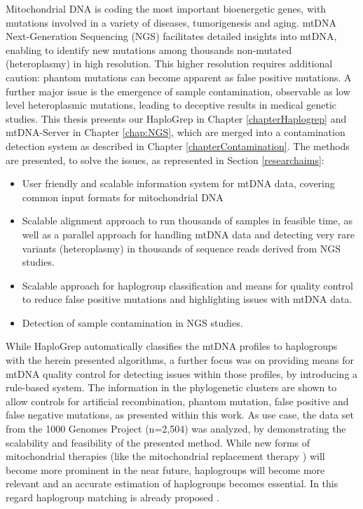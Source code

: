 Mitochondrial DNA is coding the most important bioenergetic genes, with mutations involved in a variety of diseases, tumorigenesis and aging. mtDNA Next-Generation Sequencing (NGS) facilitates detailed insights into mtDNA, enabling to identify new mutations among thousands non-mutated (heteroplasmy) in high resolution. This higher resolution requires additional caution: phantom mutations can become apparent as false positive mutations. A further major issue is the emergence of sample contamination, observable as low level heteroplasmic mutations, leading to deceptive results in medical genetic studies.
This thesis presents our HaploGrep in Chapter \ref{chapterHaplogrep} and mtDNA-Server in Chapter \ref{chap:NGS}, which are merged into a contamination detection system as described in Chapter \ref{chapterContamination}. The methods are presented, to solve the issues, as represented in Section \ref{researchaims}:
\begin{itemize}

\item User friendly and scalable information system for mtDNA data, covering common input formats for mitochondrial DNA 
\item Scalable alignment approach to run thousands of samples in feasible time, as well as a parallel approach for handling mtDNA data and detecting very rare variants (heteroplasmy) in thousands of sequence reads derived from NGS studies.
\item Scalable approach for haplogroup classification and means for quality control to reduce false positive mutations and highlighting issues with mtDNA data.
\item Detection of sample contamination in NGS studies.
\end{itemize}
While HaploGrep automatically classifies the mtDNA profiles to haplogroups with the herein presented algorithms, a further focus was on providing means for mtDNA quality control for detecting issues within those profiles, by introducing a rule-based system. The information in the phylogenetic clusters are shown to allow controls for artificial recombination, phantom mutation, false positive and false negative mutations, as presented within this work. As use case, the data set from the 1000 Genomes Project (n=2,504) was analyzed, by demonstrating the scalability and feasibility of the presented method. While new forms of mitochondrial therapies (like the mitochondrial replacement therapy \cite{Falk2016}) will become more prominent in the near future, haplogroups will become more relevant and an accurate estimation of haplogroups becomes essential. In this regard haplogroup matching is already proposed \cite{Royrvik2016}.

